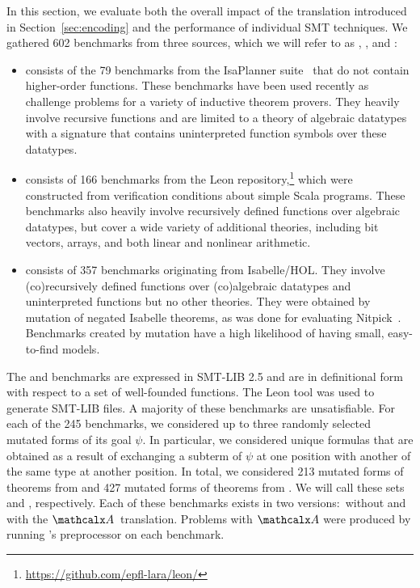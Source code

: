 In this section, we evaluate both the overall impact of the translation
introduced in Section~\ref{sec:encoding} and the performance of individual SMT
techniques.
%
We gathered 602 benchmarks from three sources, which we will refer to as
\ip, \leon, and \isanun:
\begin{itemize}
\item
\ip{} consists of the 79 benchmarks from the IsaPlanner
suite~\cite{DBLP:conf/itp/JohanssonDB10} that do not contain higher-order
functions. These benchmarks have been used recently as challenge problems for a
variety of inductive theorem provers. They heavily involve
recursive functions and are limited to a theory of algebraic datatypes
with a signature that contains uninterpreted function symbols over these datatypes.

\smallskip

\item
\leon{} consists of 166
benchmarks from the Leon repository,\footnote{%
\url{https://github.com/epfl-lara/leon/}} which were constructed from
verification conditions about simple Scala programs. These benchmarks also
heavily involve recursively defined functions over algebraic datatypes,
but cover a wide variety of additional theories, including bit vectors, arrays, and
both linear and nonlinear arithmetic.

\smallskip

\item
\isanun{} consists of 357 benchmarks originating from Isabelle/HOL. They
involve (co)recursively defined functions over (co)algebraic datatypes and
uninterpreted functions but no other theories. They were obtained by mutation
of negated Isabelle theorems, as was done for evaluating
Nitpick~\cite{blanchette-nipkow-2010}. Benchmarks created by mutation have a
high likelihood of having small, easy-to-find models.
\end{itemize}

The \ip{} and \leon{} benchmarks are expressed in SMT-LIB 2.5 and are in
definitional form with respect to a set of well-founded functions.
The Leon tool was used to generate SMT-LIB files.
A majority of these benchmarks are unsatisfiable.
For each of the 245 benchmarks,
we considered up to three randomly selected
mutated forms of its goal $\psi$. In particular, we considered unique
formulas that are obtained as a result of exchanging a subterm of $\psi$ at
one position with another of the same type at another position.
In total, we considered 213 mutated forms of
theorems from \ip and 427 mutated forms of theorems from \leon. We will
call these sets \ipm and \leonm, respectively. Each of these benchmarks exists
in two versions:\ without and with the $\conv$~translation. Problems with
$\conv$ were produced by running \cvc's preprocessor %
on each benchmark.


